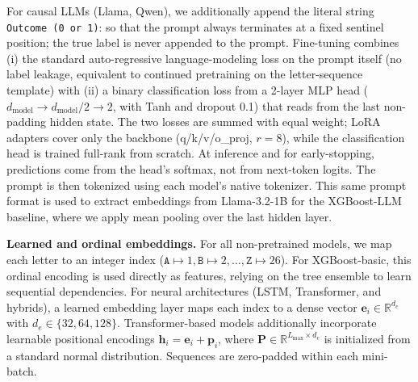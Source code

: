 \documentclass{article} %
\theoremstyle{plain}
\theoremstyle{definition}
\theoremstyle{remark}
\begin{document}
For causal LLMs (Llama, Qwen), we additionally append the literal string \texttt{Outcome (0 or 1)}: so that the prompt always terminates at a fixed sentinel position; the true label is never appended to the prompt. Fine-tuning combines (i) the standard auto-regressive language-modeling loss on the prompt itself (no label leakage, equivalent to continued pretraining on the letter-sequence template) with (ii) a binary classification loss from a 2-layer MLP head ($d_{\text{model}} \to d_{\text{model}}/2 \to 2$, with Tanh and dropout 0.1) that reads from the last non-padding hidden state. The two losses are summed with equal weight; LoRA adapters cover only the backbone (q/k/v/o\_proj, $r{=}8$), while the classification head is trained full-rank from scratch. At inference and for early-stopping, predictions come from the head's softmax, not from next-token logits. The prompt is then tokenized using each model's native tokenizer. This same prompt format is used to extract embeddings from Llama-3.2-1B for the XGBoost-LLM baseline, where we apply mean pooling over the last hidden layer.

\textbf{Learned and ordinal embeddings.} For all non-pretrained models, we map each letter to an integer index ($\texttt{A} \mapsto 1, \texttt{B} \mapsto 2, \ldots, \texttt{Z} \mapsto 26$). For XGBoost-basic, this ordinal encoding is used directly as features, relying on the tree ensemble to learn sequential dependencies. For neural architectures (LSTM, Transformer, and hybrids), a learned embedding layer maps each index to a dense vector $\mathbf{e}_i \in \mathbb{R}^{d_e}$ with $d_e \in \{32, 64, 128\}$. Transformer-based models additionally incorporate learnable positional encodings $\mathbf{h}_i = \mathbf{e}_i + \mathbf{p}_i$, where $\mathbf{P} \in \mathbb{R}^{L_{\max} \times d_e}$ is initialized from a standard normal distribution. Sequences are zero-padded within each mini-batch.
\end{document}
